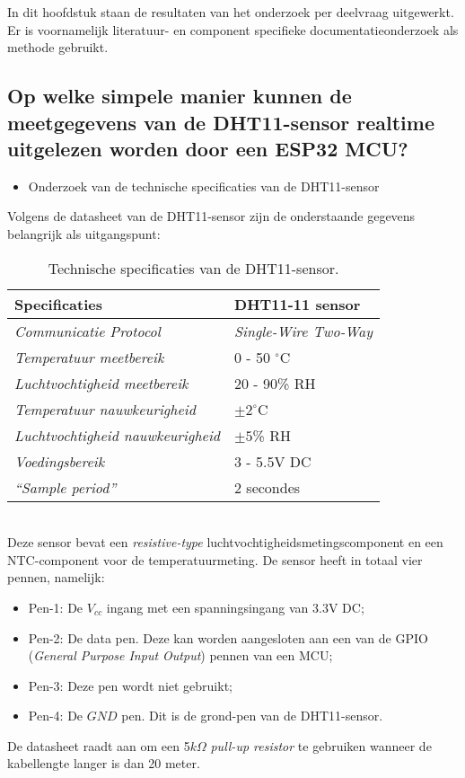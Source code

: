 In dit hoofdstuk staan de resultaten van het onderzoek per deelvraag uitgewerkt. 
Er is voornamelijk literatuur- en component specifieke documentatieonderzoek als methode gebruikt.  
\subsection{Op welke simpele manier kunnen de meetgegevens van de DHT11-sensor realtime uitgelezen worden door een ESP32 MCU?}
\label{simpel}
\begin{itemize}
    \item[\ding{226}] Onderzoek van de technische specificaties van de DHT11-sensor
\end{itemize}
Volgens de datasheet \cite{dht11} van de DHT11-sensor zijn de onderstaande gegevens belangrijk als uitgangspunt: 
\begin{table}[h]
    \centering
    \label{table:tabel12}
    \begin{tabular}{|l|l|}
    \hline
    \textbf{Specificaties}               & \textbf{DHT11-11 sensor}        \\ \hline
    \textit{Communicatie Protocol}       & \textit{Single-Wire Two-Way} \\ \hline
    \textit{Temperatuur meetbereik}      & 0 - 50 $^\circ$C      \\ \hline
    \textit{Luchtvochtigheid meetbereik} & 20 - 90\% RH      \\ \hline
    \textit{Temperatuur nauwkeurigheid}      & $\pm 2^\circ$C      \\ \hline
    \textit{Luchtvochtigheid nauwkeurigheid} & $\pm 5$\% RH      \\ \hline
    \textit{Voedingsbereik}              & 3 - 5.5V DC                     \\ \hline
    \textit{``Sample period''}           & 2 secondes                    \\ \hline
    \end{tabular}
    \linebreak
    \caption{Technische specificaties van de DHT11-sensor.}
\end{table}\\
Deze sensor bevat een \textit{resistive-type} luchtvochtigheidsmetingscomponent en een NTC-component voor de temperatuurmeting. 
De sensor heeft in totaal vier pennen, namelijk:
\begin{itemize}
    \item Pen-1: De $V_{cc}$ ingang met een spanningsingang van 3.3V DC;
    \item Pen-2: De data pen. Deze kan worden aangesloten aan een van de GPIO (\textit{General Purpose Input Output}) pennen van een MCU;
    \item Pen-3: Deze pen wordt niet gebruikt;
    \item Pen-4: De $GND$ pen. Dit is de grond-pen van de DHT11-sensor. 
\end{itemize}
De datasheet raadt aan om een 5$k\Omega$ \textit{pull-up resistor} te gebruiken wanneer de kabellengte langer is dan 20 meter.

